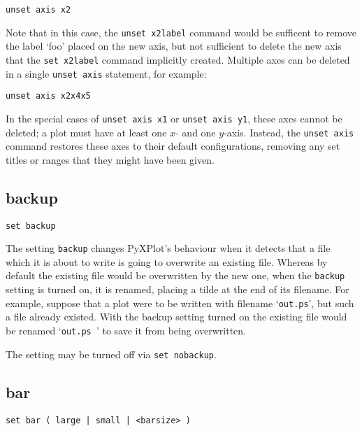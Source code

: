 \begin{verbatim}
unset axis x2
\end{verbatim}

Note that in this case, the {\tt unset x2label} command would be sufficent to
remove the label `foo' placed on the new axis, but not sufficient to delete the
new axis that the {\tt set x2label} command implicitly created. Multiple axes
can be deleted in a single {\tt unset axis} statement, for example:

\begin{verbatim}
unset axis x2x4x5
\end{verbatim}

In the special cases of {\tt unset axis x1} or {\tt unset axis y1}, these axes
cannot be deleted; a plot must have at least one $x$- and one $y$-axis. Instead,
the {\tt unset axis} command restores these axes to their default
configurations, removing any set titles or ranges that they might have been
given.

\subsection{backup}

\begin{verbatim}
set backup
\end{verbatim}

The setting {\tt backup} changes PyXPlot's behaviour when it detects that a file
which it is about to write is going to overwrite an existing file. Whereas by
default the existing file would be overwritten by the new one, when the
{\tt backup} setting is turned on, it is renamed, placing a tilde at the end of
its filename. For example, suppose that a plot were to be written with filename
`{\tt out.ps}', but such a file already existed.  With the backup setting turned on
the existing file would be renamed `{\tt out.ps~}' to save it from being overwritten.

The setting may be turned off via {\tt set nobackup}.


\subsection{bar}

\begin{verbatim}
set bar ( large | small | <barsize> )
\end{verbatim}

